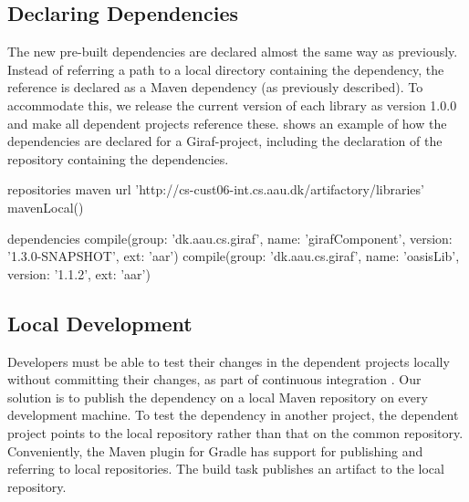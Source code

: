 \subsection{Declaring Dependencies}
The new pre-built dependencies are declared almost the same way as previously. Instead of referring a path to a local directory containing the dependency, the reference is declared as a Maven dependency (as previously described). To accommodate this, we release the current version of each library as version 1.0.0 and make all dependent projects reference these.  shows an example of how the dependencies are declared for a Giraf-project, including the declaration of the repository containing the dependencies.

\begin{gradlecode}[caption={Dependency declaration for a Giraf project},label={lst:dependency_declaration_giraf}]
repositories {
    maven {
        url 'http://cs-cust06-int.cs.aau.dk/artifactory/libraries'
    }
    mavenLocal()
}

dependencies {
    compile(group: 'dk.aau.cs.giraf', name: 'girafComponent', version: '1.3.0-SNAPSHOT', ext: 'aar')
    compile(group: 'dk.aau.cs.giraf', name: 'oasisLib', version: '1.1.2', ext: 'aar')
}
\end{gradlecode}

\subsection{Local Development}
Developers must be able to test their changes in the dependent projects locally without committing their changes, as part of continuous integration \parencite{fowlerCI}. Our solution is to publish the dependency on a local Maven repository on every development machine. To test the dependency in another project, the dependent project points to the local repository rather than that on the common repository. Conveniently, the Maven plugin for Gradle has support for publishing and referring to local repositories. The build task  publishes an artifact to the local repository.


